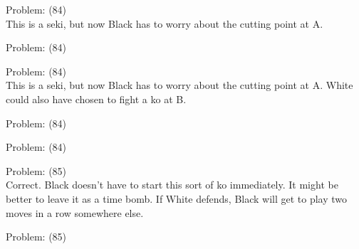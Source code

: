 \documentclass[11pt]{article}
\begin{document}
\begin{minipage}[t]{0.5\textwidth}
  {\centering
  
  Problem: (84)\\
  This is a seki, but now Black has to worry about the cutting point at A.\\
  }
\end{minipage}
\begin{minipage}[t]{0.5\textwidth}
  {\centering
  
  Problem: (84)\\
  
  }
\end{minipage}
\begin{minipage}[t]{0.5\textwidth}
  {\centering
  
  Problem: (84)\\
  This is a seki, but now Black has to worry about the cutting point at A. White could also have chosen to fight a ko at B.\\
  }
\end{minipage}
\begin{minipage}[t]{0.5\textwidth}
  {\centering
  
  Problem: (84)\\
  
  }
\end{minipage}
\begin{minipage}[t]{0.5\textwidth}
  {\centering
  
  Problem: (84)\\
  
  }
\end{minipage}
\begin{minipage}[t]{0.5\textwidth}
  {\centering
  
  Problem: (85)\\
  Correct. Black doesn't have to start this sort of ko immediately. It might be better to leave it as a time bomb. If White defends, Black will get to play two moves in a row somewhere else.\\
  }
\end{minipage}
\begin{minipage}[t]{0.5\textwidth}
  {\centering
  
  Problem: (85)\\
  
  }
\end{minipage}
\end{document}
